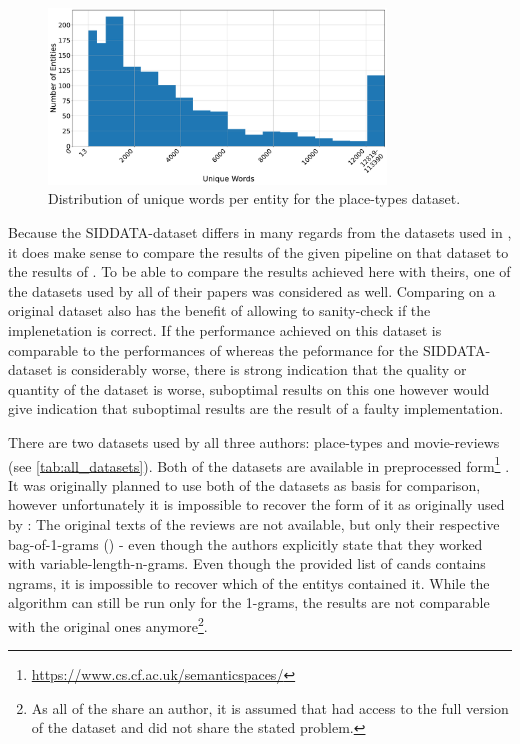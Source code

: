 \begin{figure}[H]
	\centering
	\includegraphics[width=0.8\textwidth]{graphics/figures/placetypes_dist_unique.pdf}
	\caption{Distribution of unique words per entity for the place-types dataset.}
	\label{fig:placetypes_dist_unique}
\end{figure}




Because the SIDDATA-dataset differs in many regards from the datasets used in \mainalgos, %
it does make sense to compare the results of the given pipeline on that dataset to the results of \mainalgos. To be able to compare the results achieved here with theirs, one of the datasets used by all of their papers was considered as well. Comparing on a original dataset also has the benefit of allowing to sanity-check if the implenetation is correct. If the performance achieved on this dataset is comparable to the performances of \mainalgos whereas the peformance for the SIDDATA-dataset is considerably worse, there is strong indication that the quality or quantity of the dataset is worse, suboptimal results on this one however would give indication that suboptimal results are the result of a faulty implementation.

There are two datasets used by all three authors: place-types and movie-reviews (see \autoref{tab:all_datasets}). Both of the datasets are available in preprocessed form\footnote{\url{https://www.cs.cf.ac.uk/semanticspaces/}} \cite{Derrac2015}. It was originally planned to use both of the datasets as basis for comparison, however unfortunately it is impossible to recover the form of it as originally used by \textcite{Derrac2015}: The original texts of the reviews are not available, but only their respective bag-of-1-grams () - even though the authors explicitly state that they worked with variable-length-n-grams. Even though the provided list of \glspl{cand} contains \glspl{ngram}, it is impossible to recover which of the \glspl{entity} contained it. While the algorithm can still be run only for the 1-grams, the results are not comparable with the original ones anymore\footnote{As all of the \mainalgos share an author, it is assumed that \cite{Alshaikh2020,Ager2018} had access to the full version of the dataset and did not share the stated problem.}.

